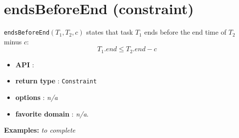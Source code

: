 \section{endsBeforeEnd (constraint)}\label{endsbeforeend:endsbeforeendconstraint}\hypertarget{endsbeforeend:endsbeforeendconstraint}{}
\begin{notedef}
\texttt{endsBeforeEnd}$(T_1,T_2,c)$  states that task $T_1$ ends before the end time of $T_2$ minus $c$:
  $$T_{1}.end \le T_{2}.end - c$$
\end{notedef}

\begin{itemize}
	\item \textbf{API} :
	\item \textbf{return type} : \texttt{Constraint}
	\item \textbf{options} : \emph{n/a}
	\item \textbf{favorite domain} : \emph{n/a}.
\end{itemize}

\textbf{Examples:}
%
\emph{to complete}
